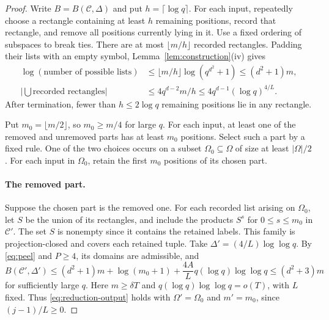 \documentclass[11pt,a4paper]{article}
\numberwithin{equation}{section}
\newcommand{\cC}{\mathcal C}
\begin{document}
\begin{proof}
Write $B=B(\cC,\Delta)$ and put $h=\lceil\log q\rceil$.
For each input, repeatedly choose a rectangle containing at
least $h$ remaining positions, record that rectangle, and remove
all positions currently lying in it. Use a fixed ordering of
subspaces to break ties. There are at most $\lfloor m/h\rfloor$
recorded rectangles. Padding their lists with an empty symbol,
Lemma~\ref{lem:construction}(iv) gives
\begin{equation}\label{eq:peel}
 \begin{aligned}
 \log(\text{number of possible lists})
 &\le\lfloor m/h\rfloor\log(q^{d^2}+1)\le(d^2+1)m,\\
 \left|\bigcup\text{recorded rectangles}\right|
 &\le4q^{d-2}m/h\le4q^{d-1}(\log q)^{4/L}.
 \end{aligned}
\end{equation}
After termination, fewer than $h\le2\log q$ remaining positions
lie in any rectangle.

Put $m_0=\lfloor m/2\rfloor$, so $m_0\ge m/4$ for large $q$.
For each input, at least one of the removed and unremoved parts
has at least $m_0$ positions. Select such a part by a fixed rule.
One of the two choices occurs on a subset $\Omega_0\subseteq\Omega$
of size at least $|\Omega|/2$.
For each input in $\Omega_0$, retain the first $m_0$ positions
of its chosen part.

\paragraph{The removed part.}
Suppose the chosen part is the removed one.
For each recorded list arising on $\Omega_0$, let $S$ be the
union of its rectangles, and include the products $S^s$ for
$0\le s\le m_0$ in $\cC'$.
The set $S$ is nonempty since it contains the retained labels.
This family is projection-closed and covers each retained tuple.
Take $\Delta'=(4/L)\log\log q$.
By \eqref{eq:peel} and $P\ge4$, its domains are admissible, and
\[
 B(\cC',\Delta')
 \le(d^2+1)m+\log(m_0+1)
       +\frac{4A}{L}q(\log q)\log\log q
 \le(d^2+3)m
\]
for sufficiently large $q$.
Here $m\ge\delta T$ and
$q(\log q)\log\log q=o(T)$, with $L$ fixed.
Thus \eqref{eq:reduction-output} holds with
$\Omega'=\Omega_0$ and $m'=m_0$, since $(j-1)/L\ge0$.


\end{proof}
\end{document}
